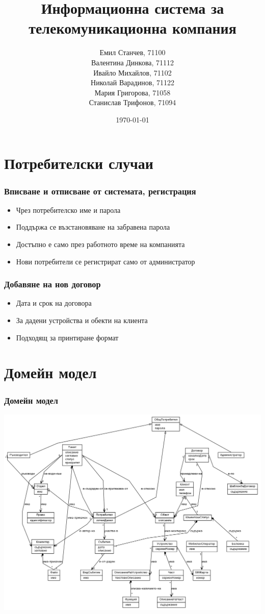 \documentclass{beamer}
\title[ИС за телекомуникационна компания]{Информационна система за телекомуникационна компания}
\author{\tiny {Емил Станчев, 71100 \\
	Валентина Динкова, 71112 \\
	Ивайло Михайлов, 71102 \\
	Николай Варадинов, 71122 \\
	Мария Григорова, 71058 \\
	Станислав Трифонов, 71094 
	}
	}
\institute{ФМИ}
\date{\tiny{\today}}
\begin{document}
\begin{frame}
  \titlepage
\end{frame}

\section{Потребителски случаи}
\begin{frame}
  \frametitle{Вписване и отписване от системата, регистрация}
    \begin{itemize}
      \item Чрез потребителско име и парола
      \item Поддържа се възстановяване на забравена парола
      \item Достъпно е само през работното време на компанията
      \item Нови потребители се регистрират само от администратор
    \end{itemize}
\end{frame}

\begin{frame}
  \frametitle{Добавяне на нов договор}
    \begin{itemize}
	\item Дата и срок на договора
	\item За дадени устройства и обекти на клиента
	\item Подходящ за принтиране формат
    \end{itemize}
\end{frame}

\section{Домейн модел}
\begin{frame}
  \frametitle{Домейн модел}
  \includegraphics[width= 0.7\paperwidth]{../diagrams/domain.png}
\end{frame}
\end{document}
